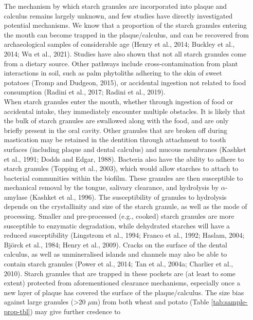 \documentclass[utf8]{../templates/frontiersSCNS}
\begin{document}
The mechanism by which starch granules are incorporated into plaque and calculus
remains largely unknown, and few studies have directly investigated potential
mechanisms. We know that a proportion of the starch granules entering
the mouth can become trapped in the plaque/calculus, and can be recovered from
archaeological samples of considerable age
(Henry et al., 2014; Buckley et al., 2014; Wu et al., 2021).
Studies have also shown that not all starch granules come from a dietary source.
Other pathways include cross-contamination from plant interactions in soil, such
as palm phytoliths adhering to the skin of sweet potatoes
(Tromp and Dudgeon, 2015),
or accidental ingestion not related to food consumption
(Radini et al., 2017; Radini et al., 2019).\\
When starch granules enter the mouth, whether through ingestion of food or accidental
intake, they immediately encounter multiple obstacles. It is likely
that the bulk of starch granules are swallowed along with the food, and are
only briefly present in the oral cavity. Other granules that are broken off
during mastication may be retained in the dentition through attachment to
tooth surfaces (including plaque and dental calculus) and mucous membranes
(Kashket et al., 1991; Dodds and Edgar, 1988).
Bacteria also have the ability to adhere to starch granules
(Topping et al., 2003),
which would allow starches to attach to bacterial communities within the biofilm.
These granules are then
susceptible to mechanical removal by the tongue, salivary clearance, and hydrolysis
by \(\alpha\)-amylase (Kashket et al., 1996).
The susceptibility of granules to hydrolysis depends on the crystallinity and size
of the starch granule, as well as the mode of processing. Smaller and pre-processed
(e.g., cooked) starch granules are more susceptible to enzymatic degradation,
while dehydrated starches will have a reduced susceptibility
(Lingstrom et al., 1994; Franco et al., 1992; Haslam, 2004; Björck et al., 1984; Henry et al., 2009).
Cracks on the surface of the dental calculus, as well as unmineralised islands
and channels may also be able to contain starch granules
(Power et al., 2014; Tan et al., 2004a; Charlier et al., 2010).
Starch granules that are trapped in these pockets are (at least to some extent)
protected from aforementioned clearance mechanisms, especially once
a new layer of plaque has covered the surface of the plaque/calculus.
The size bias against large granules (\textgreater20 \(\mu\)m) from both wheat and potato
(Table \ref{tab:sample-prop-tbl}) may give further credence to
\end{document}

